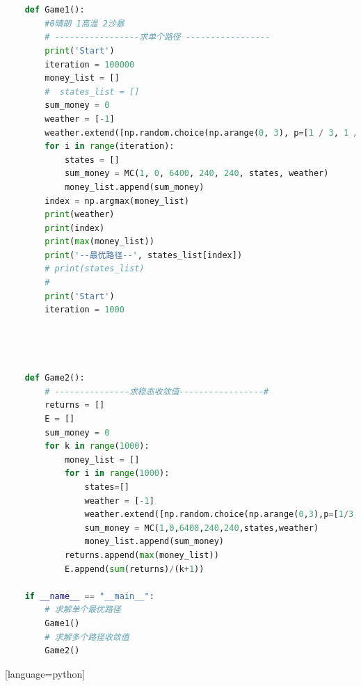 \documentclass[withoutpreface,bwprint]{cumcmthesis} %
\begin{document}
\begin{appendices}
\begin{lstlisting}[language=python]
    
    
    def Game1():
        #0晴朗 1高温 2沙暴
        # -----------------求单个路径 -----------------
        print('Start')
        iteration = 100000
        money_list = []
        #  states_list = []
        sum_money = 0
        weather = [-1]
        weather.extend([np.random.choice(np.arange(0, 3), p=[1 / 3, 1 / 2, 1 / 6]) for _ in range(30)])
        for i in range(iteration):
            states = []
            sum_money = MC(1, 0, 6400, 240, 240, states, weather)
            money_list.append(sum_money)
        index = np.argmax(money_list)
        print(weather)
        print(index)
        print(max(money_list))
        print('--最优路径--', states_list[index])
        # print(states_list)
        #
        print('Start')
        iteration = 1000
    
    
    
    
    def Game2():
        # ---------------求稳态收敛值-----------------#
        returns = []
        E = []
        sum_money = 0
        for k in range(1000):
            money_list = []
            for i in range(1000):
                states=[]
                weather = [-1]
                weather.extend([np.random.choice(np.arange(0,3),p=[1/3,1/2,1/6]) for _ in range(30)])
                sum_money = MC(1,0,6400,240,240,states,weather)
                money_list.append(sum_money)
            returns.append(max(money_list))
            E.append(sum(returns)/(k+1))
        
    if __name__ == "__main__":
        # 求解单个最优路径
        Game1()
        # 求解多个路径收敛值
        Game2()    
\end{lstlisting}[language=python]

\end{appendices}
\end{document}
